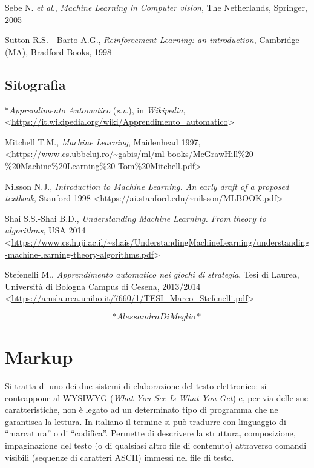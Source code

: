 \documentclass[
  b5paper,
  twoside,
  11pt,
  chapterprefix=false,
  bibliography=totocnumbered,
  listof=flat]{scrbook}
\begin{document}
Sebe N. \emph{et al}., \emph{Machine Learning in Computer vision}, The
Netherlands, Springer, 2005

Sutton R.S. - Barto A.G., \emph{Reinforcement Learning: an introduction},
Cambridge (MA), Bradford Books, 1998

\hypertarget{sitografia-18}{%
\section*{Sitografia}\label{sitografia-18}}

*\emph{Apprendimento Automatico} (\emph{s}.\emph{v}.), in \emph{Wikipedia},
\textless{}\href{https://it.wikipedia.org/wiki/Apprendimento_automatico}{{https://it.wikipedia.org/wiki/Apprendimento\_automatico}}\textgreater{}

Mitchell T.M., \emph{Machine Learning}, Maidenhead 1997,
\textless{}\href{https://www.cs.ubbcluj.ro/~gabis/ml/ml-books/McGrawHill\%20-\%20Machine\%20Learning\%20-Tom\%20Mitchell.pdf}{{https://www.cs.ubbcluj.ro/\textasciitilde gabis/ml/ml-books/McGrawHill\%20-\%20Machine\%20Learning\%20-Tom\%20Mitchell.pdf}}\textgreater{}

Nilsson N.J., \emph{Introduction to Machine Learning. An early draft of a
proposed textbook}, Stanford 1998
\textless{}\href{https://ai.stanford.edu/~nilsson/MLBOOK.pdf}{{https://ai.stanford.edu/\textasciitilde nilsson/MLBOOK.pdf}}\textgreater{}

Shai S.S.-Shai B.D., \emph{Understanding Machine Learning. From theory to
algorithms}, USA 2014
\textless{}\href{https://www.cs.huji.ac.il/~shais/UnderstandingMachineLearning/understanding-machine-learning-theory-algorithms.pdf}{{https://www.cs.huji.ac.il/\textasciitilde shais/UnderstandingMachineLearning/understanding-machine-learning-theory-algorithms.pdf}}\textgreater{}

Stefenelli M., \emph{Apprendimento automatico nei giochi di strategia}, Tesi
di Laurea, Università di Bologna Campus di Cesena, 2013/2014
\textless{}{\url{https://amslaurea.unibo.it/7660/1/TESI_Marco_Stefenelli.pdf}\textgreater{}}

\[*Alessandra Di Meglio*\]

\hypertarget{markup}{%
\chapter{Markup}\label{markup}}

Si tratta di uno dei due sistemi di elaborazione del testo elettronico:
si contrappone al WYSIWYG (\emph{What You See Is What You Get}) e, per via
delle sue caratteristiche, non è legato ad un determinato tipo di
programma che ne garantisca la lettura. In italiano il termine si può
tradurre con linguaggio di \enquote{marcatura} o di \enquote{codifica}. Permette di
descrivere la struttura, composizione, impaginazione del testo (o di
qualsiasi altro file di contenuto) attraverso comandi visibili (sequenze
di caratteri ASCII) immessi nel file di testo.
\end{document}

